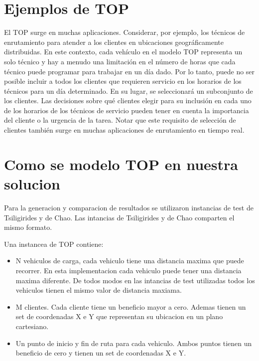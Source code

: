 \section{Ejemplos de TOP}

El TOP surge en muchas aplicaciones. Considerar, por ejemplo, los técnicos de enrutamiento para atender a los clientes en ubicaciones geográficamente distribuidas. En este contexto, cada vehículo en el modelo TOP representa un solo técnico y hay a menudo una limitación en el número de horas que cada técnico puede programar para trabajar en un día dado. Por lo tanto, puede no ser posible incluir a todos los clientes que requieren servicio en los horarios de los técnicos para un día determinado. En su lugar, se seleccionará un subconjunto de los clientes. Las decisiones sobre qué clientes elegir para su inclusión en cada uno de los horarios de los técnicos de servicio pueden tener en cuenta la importancia del cliente o la urgencia de la tarea. Notar que este requisito de selección de clientes también surge en muchas aplicaciones de enrutamiento en tiempo real.

\section{Como se modelo TOP en nuestra solucion}

Para la generacion y comparacion de resultados se utilizaron instancias de test de Tsiligirides y de Chao. Las intancias de Tsiligirides y de Chao comparten el mismo formato. 

\bigskip

\begin{minipage}{\textwidth}
Una instancea de TOP contiene:

\begin{itemize}
  \item N vehiculos de carga, cada vehiculo tiene una distancia maxima que puede recorrer. En esta implementacion cada vehiculo puede tener una distancia maxima diferente. De todos modos en las intancias de test utilizadas todos los vehiculos tienen el mismo valor de distancia maxiama.
  \item M clientes. Cada cliente tiene un beneficio mayor a cero. Ademas tienen un set de coordenadas X e Y que representan su ubicacion en un plano cartesiano.
  \item Un punto de inicio y fin de ruta para cada vehiculo. Ambos puntos tienen un beneficio de cero y tienen un set de coordenadas X e Y.
\end{itemize}
\end{minipage}

